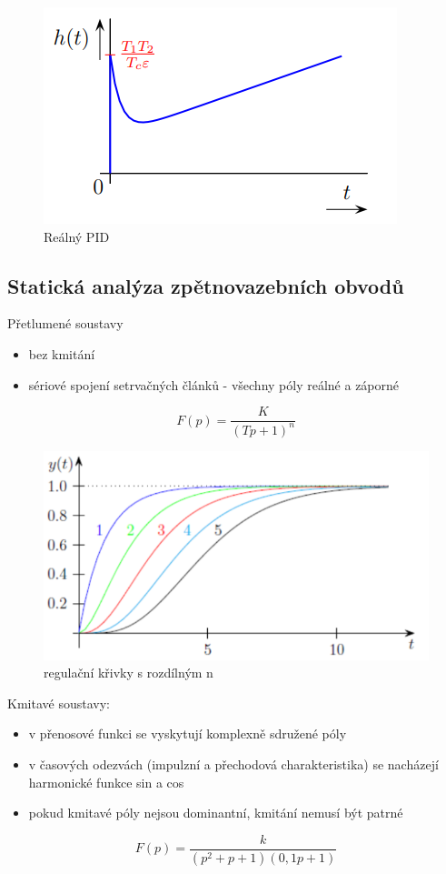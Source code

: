 \begin{figure}[H]
    \includegraphics[scale = 1]{images/PID.png}
    \caption{Reálný PID}
    \label{PID}
\end{figure}
\subsection*{Statická analýza zpětnovazebních obvodů}
Přetlumené soustavy
\begin{itemize}
    \item bez kmitání
    \item sériové spojení setrvačných článků - všechny póly reálné a záporné
\end{itemize}
\begin{equation}
    F(p) =\frac{K}{(Tp+1)^n}
\end{equation}
\begin{figure}[H]
    \includegraphics[scale = 1]{images/tlumeni.png}
    \caption{regulační křivky s rozdílným n}
\end{figure}

Kmitavé soustavy:
\begin{itemize}
    \item v přenosové funkci se vyskytují komplexně sdružené póly
    \item v časových odezvách (impulzní a přechodová charakteristika) se nacházejí harmonické funkce sin a cos
    \item pokud kmitavé póly nejsou dominantní, kmitání nemusí být patrné
\end{itemize}
\begin{equation}
    F(p) = \frac{k}{(p^2+p+1)(0,1p+1)}
\end{equation}

